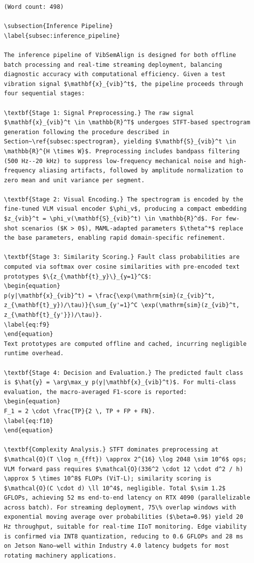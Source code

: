 \begin{verbatim}
(Word count: 498)

\subsection{Inference Pipeline}
\label{subsec:inference_pipeline}

The inference pipeline of VibSemAlign is designed for both offline batch processing and real-time streaming deployment, balancing diagnostic accuracy with computational efficiency. Given a test vibration signal $\mathbf{x}_{vib}^t$, the pipeline proceeds through four sequential stages:

\textbf{Stage 1: Signal Preprocessing.} The raw signal $\mathbf{x}_{vib}^t \in \mathbb{R}^T$ undergoes STFT-based spectrogram generation following the procedure described in Section~\ref{subsec:spectrogram}, yielding $\mathbf{S}_{vib}^t \in \mathbb{R}^{H \times W}$. Preprocessing includes bandpass filtering (500 Hz--20 kHz) to suppress low-frequency mechanical noise and high-frequency aliasing artifacts, followed by amplitude normalization to zero mean and unit variance per segment.

\textbf{Stage 2: Visual Encoding.} The spectrogram is encoded by the fine-tuned VLM visual encoder $\phi_v$, producing a compact embedding $z_{vib}^t = \phi_v(\mathbf{S}_{vib}^t) \in \mathbb{R}^d$. For few-shot scenarios ($K > 0$), MAML-adapted parameters $\theta^*$ replace the base parameters, enabling rapid domain-specific refinement.

\textbf{Stage 3: Similarity Scoring.} Fault class probabilities are computed via softmax over cosine similarities with pre-encoded text prototypes $\{z_{\mathbf{t}_y}\}_{y=1}^C$:
\begin{equation}
p(y|\mathbf{x}_{vib}^t) = \frac{\exp(\mathrm{sim}(z_{vib}^t, z_{\mathbf{t}_y})/\tau)}{\sum_{y'=1}^C \exp(\mathrm{sim}(z_{vib}^t, z_{\mathbf{t}_{y'}})/\tau)}.
\label{eq:f9}
\end{equation}
Text prototypes are computed offline and cached, incurring negligible runtime overhead.

\textbf{Stage 4: Decision and Evaluation.} The predicted fault class is $\hat{y} = \arg\max_y p(y|\mathbf{x}_{vib}^t)$. For multi-class evaluation, the macro-averaged F1-score is reported:
\begin{equation}
F_1 = 2 \cdot \frac{TP}{2 \, TP + FP + FN}.
\label{eq:f10}
\end{equation}

\textbf{Complexity Analysis.} STFT dominates preprocessing at $\mathcal{O}(T \log n_{fft}) \approx 2^{16} \log 2048 \sim 10^6$ ops; VLM forward pass requires $\mathcal{O}(336^2 \cdot 12 \cdot d^2 / h) \approx 5 \times 10^8$ FLOPs (ViT-L); similarity scoring is $\mathcal{O}(C \cdot d) \ll 10^4$, negligible. Total $\sim 1.2$ GFLOPs, achieving 52 ms end-to-end latency on RTX 4090 (parallelizable across batch). For streaming deployment, 75\% overlap windows with exponential moving average over probabilities ($\beta=0.9$) yield 20 Hz throughput, suitable for real-time IIoT monitoring. Edge viability is confirmed via INT8 quantization, reducing to 0.6 GFLOPs and 28 ms on Jetson Nano—well within Industry 4.0 latency budgets for most rotating machinery applications.


\end{verbatim}
